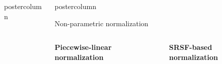 \documentclass[final, size=a0]{beamer}
\newlength{\columnheight}
\begin{document}
\begin{frame}
\begin{columns}
\begin{column}{.33\textwidth}
\begin{beamercolorbox}[center,wd=\textwidth]{postercolumn}
\begin{minipage}[T]{.95\textwidth}
{          }
        \end{minipage}
      \end{beamercolorbox}
    \end{column}
    \begin{column}{.33\textwidth}
      \begin{beamercolorbox}[center,wd=\textwidth]{postercolumn}
        \begin{minipage}[T]{.95\textwidth}  %
          \parbox[t][\columnheight]{\textwidth}{ %
            
            \begin{alertblock}{Non-parametric normalization}

              \begin{columns}
                \begin{column}{.5\textwidth}
                  \begin{center}
                    \textbf{Piecewise-linear normalization}
                  \end{center}
                \end{column}
                \begin{column}{.5\textwidth}
                  \begin{center}
                    \textbf{SRSF-based normalization}
                  \end{center}
                \end{column}
              \end{columns}
              

\end{alertblock}}
\end{minipage}
\end{beamercolorbox}
\end{column}
\end{columns}
\end{frame}
\end{document}
